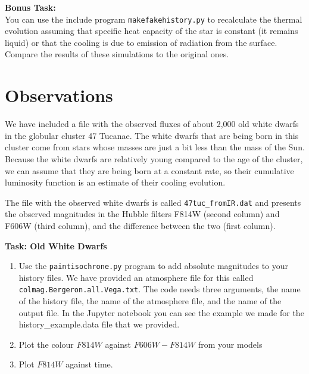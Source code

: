 \documentclass{article}
\begin{document}

\textbf{Bonus Task:}\\
You can use the include program \texttt{makefakehistory.py} to recalculate the thermal evolution assuming that specific heat capacity of the star is constant (it remains liquid) or that the cooling is due to emission of radiation from the surface.  Compare the results of these simulations to the original ones.

\section{Observations}

We have included a file with the observed fluxes of about 2,000 old white dwarfs in the globular cluster 47 Tucanae.  The white dwarfs that are being born in this cluster come from stars whose masses are just a bit less than the mass of the Sun.   Because the white dwarfs are relatively young compared to the age of the cluster, we can assume that they are being born at a constant rate, so their cumulative luminosity function is an estimate of their cooling evolution.

The file with the observed white dwarfs is called \texttt{47tuc\_fromIR.dat} and presents the observed magnitudes in the Hubble filters F814W (second column) and F606W (third column), and the difference between the two (first column).

\textbf{Task: Old White Dwarfs}\vspace{-1em}
\begin{enumerate}
 \setlength\itemsep{0em}
\item Use the \texttt{paintisochrone.py} program to add absolute magnitudes to your history files.  We have provided an atmosphere file for this called \texttt{colmag.Bergeron.all.Vega.txt}. The code needs three arguments, the name of the history file, the name of the atmosphere file, and the name of the output file. In the Jupyter notebook you can see the example we made for the history\_example.data file that we provided.
\item Plot the colour $F814W$ against $F606W-F814W$ from your models
\item Plot $F814W$ against time.
\end{enumerate}
\end{document}
